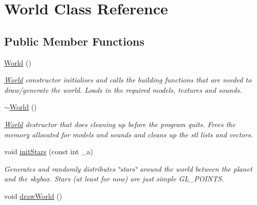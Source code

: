 \hypertarget{classWorld}{
\section{World Class Reference}
\label{classWorld}
}
\subsection*{Public Member Functions}
\begin{DoxyCompactItemize}
\item 
\hypertarget{classWorld_afa39d4e6f714a7a3691ac0c656f5e8a8}{
\hyperlink{classWorld_afa39d4e6f714a7a3691ac0c656f5e8a8}{World} ()}
\label{classWorld_afa39d4e6f714a7a3691ac0c656f5e8a8}

\begin{DoxyCompactList}\small\item\em \hyperlink{classWorld}{World} constructor initialises and calls the building functions that are needed to draw/generate the world. Loads in the required models, textures and sounds. \item\end{DoxyCompactList}\item 
\hypertarget{classWorld_a8c73fba541a5817fff65147ba47cd827}{
\hyperlink{classWorld_a8c73fba541a5817fff65147ba47cd827}{$\sim$World} ()}
\label{classWorld_a8c73fba541a5817fff65147ba47cd827}

\begin{DoxyCompactList}\small\item\em \hyperlink{classWorld}{World} destructor that does cleaning up before the program quits. Frees the memory allocated for models and sounds and cleans up the stl lists and vectors. \item\end{DoxyCompactList}\item 
void \hyperlink{classWorld_a6dd84a97b1bd38e94453cc31edcada8d}{initStars} (const int \_\-a)
\begin{DoxyCompactList}\small\item\em Generates and randomly distributes \char`\"{}stars\char`\"{} around the world between the planet and the skybox. Stars (at least for now) are just simple GL\_\-POINTS. \item\end{DoxyCompactList}\item 
\hypertarget{classWorld_a072497d989ccb4fe6828eafcb45ca497}{
void \hyperlink{classWorld_a072497d989ccb4fe6828eafcb45ca497}{drawWorld} ()}
\label{classWorld_a072497d989ccb4fe6828eafcb45ca497}


\end{DoxyCompactItemize}
